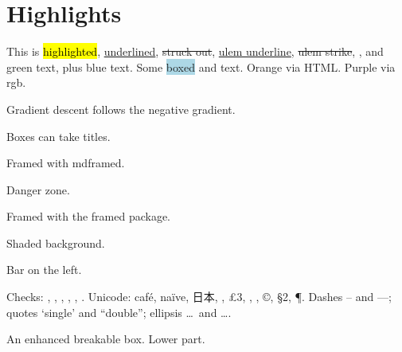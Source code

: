 \documentclass{article}
\begin{document}
\section{Highlights}
This is \hl{highlighted}, \ul{underlined}, \st{struck out}, \uline{ulem underline}, \sout{ulem strike},
,  and \textcolor{mygreen}{green text}, plus {\color{myblue} blue text}.
Some \colorbox{lightblue}{boxed} and  text.
\textcolor[HTML]{FF5733}{Orange via HTML.} \textcolor[rgb]{0.5,0,0.5}{Purple via rgb.}


\begin{tcolorbox}[colback=yellow!10, colframe=orange, title=Key Idea]
Gradient descent follows the negative gradient.
\end{tcolorbox}

\begin{infobox}[Note]
Boxes can take titles.
\end{infobox}

\begin{mdframed}[backgroundcolor=gray!10, linecolor=black]
Framed with mdframed.
\end{mdframed}

\begin{warningbox}
Danger zone.
\end{warningbox}

\begin{framed}
Framed with the framed package.
\end{framed}

\begin{shaded}
Shaded background.
\end{shaded}

\begin{leftbar}
Bar on the left.
\end{leftbar}

Checks: \checkmark, , , , \cmark, \xmark. Unicode: café, naïve, 日本, , \pounds 3, \textregistered, \texttrademark, \copyright, \S 2, \P.
Dashes -- and ---; quotes `single' and ``double''; ellipsis \ldots\ and \dots.

\begin{tcolorbox}[enhanced, breakable, colback=white, colframe=myblue, sharp corners, boxrule=1pt]
An enhanced breakable box.
\tcblower
Lower part.
\end{tcolorbox}

\end{document}
